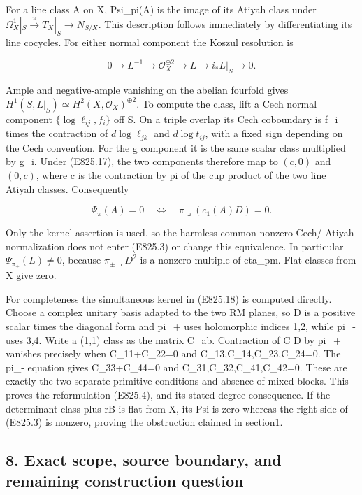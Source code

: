 For a line class A on X, Psi\_pi(A) is the image of its Atiyah class
under \(\Omega_X^1|_S\xrightarrow{\pi}T_X|_S\to N_{S/X}\). This
description follows immediately by differentiating its line cocycles.
For either normal component the Koszul resolution is

\[
 0\to L^{-1}\to\mathcal O_X^{\oplus2}\to L\to i_*L|_S\to0.
 \tag{E825.17}
\]

Ample and negative-ample vanishing on the abelian fourfold gives
\(H^1(S,L|_S)\simeq H^2(X,\mathcal O_X)^{\oplus2}\). To compute the
class, lift a Cech normal component \(\{\log\ell_{ij},f_i\}\) off S. On
a triple overlap its Cech coboundary is f\_i times the contraction of
\(d\log\ell_{jk}\) and \(d\log t_{ij}\), with a fixed sign depending on
the Cech convention. For the g component it is the same scalar class
multiplied by g\_i. Under (E825.17), the two components therefore map to
\((c,0)\) and \((0,c)\), where c is the contraction by pi of the cup
product of the two line Atiyah classes. Consequently

\[
 \Psi_\pi(A)=0
       \quad\Longleftrightarrow\quad
       \pi\mathbin\lrcorner(c_1(A)D)=0.
 \tag{E825.18}
\]

Only the kernel assertion is used, so the harmless common nonzero Cech/
Atiyah normalization does not enter (E825.3) or change this equivalence.
In particular \(\Psi_{\pi_\pm}(L)\ne0\), because
\(\pi_\pm\mathbin\lrcorner D^2\) is a nonzero multiple of eta\_pm. Flat
classes from X give zero.

For completeness the simultaneous kernel in (E825.18) is computed
directly. Choose a complex unitary basis adapted to the two RM planes,
so D is a positive scalar times the diagonal form and pi\_+ uses
holomorphic indices 1,2, while pi\_- uses 3,4. Write a (1,1) class as
the matrix C\_ab. Contraction of C D by pi\_+ vanishes precisely when
C\_11+C\_22=0 and C\_13,C\_14,C\_23,C\_24=0. The pi\_- equation gives
C\_33+C\_44=0 and C\_31,C\_32,C\_41,C\_42=0. These are exactly the two
separate primitive conditions and absence of mixed blocks. This proves
the reformulation (E825.4), and its stated degree consequence. If the
determinant class plus rB is flat from X, its Psi is zero whereas the
right side of (E825.3) is nonzero, proving the obstruction claimed in
section1.

\subsection{8. Exact scope, source boundary, and remaining construction
question}\label{SF-E825:exact-scope-source-boundary-and-remaining-construction-question}

